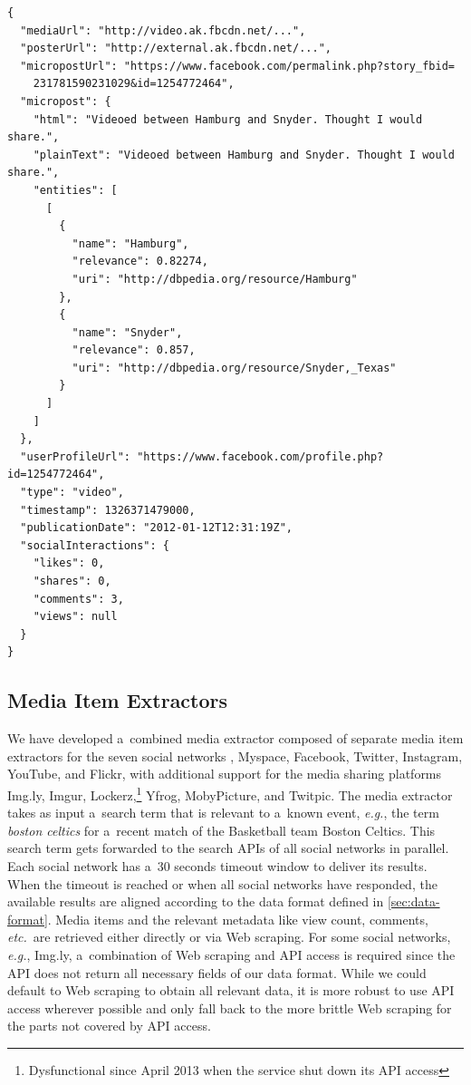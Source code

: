 \begin{lstlisting}[caption={[Sample output of the media extractor]{Sample output of the media extractor
  showing a~Facebook post processed with named entity extraction
  and disambiguation (slightly shortened for legibility)}},
  label={code:facebook}]
{
  "mediaUrl": "http://video.ak.fbcdn.net/...",
  "posterUrl": "http://external.ak.fbcdn.net/...",
  "micropostUrl": "https://www.facebook.com/permalink.php?story_fbid=
    231781590231029&id=1254772464",
  "micropost": {
    "html": "Videoed between Hamburg and Snyder. Thought I would share.",
    "plainText": "Videoed between Hamburg and Snyder. Thought I would share.",
    "entities": [
      [
        {
          "name": "Hamburg",
          "relevance": 0.82274,
          "uri": "http://dbpedia.org/resource/Hamburg"
        },
        {
          "name": "Snyder",
          "relevance": 0.857,
          "uri": "http://dbpedia.org/resource/Snyder,_Texas"
        }
      ]
    ]
  },
  "userProfileUrl": "https://www.facebook.com/profile.php?id=1254772464",
  "type": "video",
  "timestamp": 1326371479000,
  "publicationDate": "2012-01-12T12:31:19Z",
  "socialInteractions": {
    "likes": 0,
    "shares": 0,
    "comments": 3,
    "views": null
  }
}
\end{lstlisting}

\subsection{Media Item Extractors}
\label{sec:media-item-extractors}

We have developed a~combined media extractor composed of
separate media item extractors for the seven social networks
\googleplus, Myspace, Facebook, Twitter, Instagram, YouTube,
and Flickr, with additional support for the media sharing
platforms Img.ly, Imgur, Lockerz,\footnote{Dysfunctional since April 2013 when the service shut down its API access} Yfrog, MobyPicture, and Twitpic.
The media extractor takes as input a~search term that is relevant
to a~known event, \emph{e.g.}, the term \emph{boston celtics}
for a~recent match of the Basketball team Boston Celtics.
This search term gets forwarded to the search APIs
of all social networks in parallel.
Each social network has a~30 seconds timeout window
to deliver its results.
When the timeout is reached
or when all social networks have responded,
the available results are aligned according to the data format
defined in \autoref{sec:data-format}.
Media items and the relevant metadata like view count, comments,
\emph{etc.}\ are retrieved either directly or via Web scraping.
For some social networks, \emph{e.g.}, Img.ly,
a~combination of Web scraping and API access is required
since the API does not return all necessary fields
of our data format.
While we could default to Web scraping
to obtain all relevant data,
it is more robust to use API access wherever possible
and only fall back to the more brittle Web scraping
for the parts not covered by API access.

